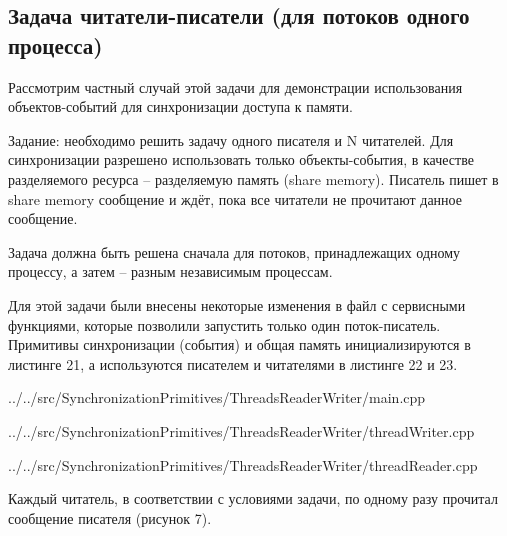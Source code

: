 \documentclass[a4paper, 12pt]{article}		%
\begin{document}
\newpage
\subsection{Задача читатели-писатели (для потоков одного процесса)}

Рассмотрим частный случай этой задачи для демонстрации использования объектов-событий для синхронизации доступа к памяти.

Задание: необходимо решить задачу одного писателя и N читателей. Для синхронизации разрешено использовать только объекты-события, в качестве разделяемого ресурса -- разделяемую память (share memory). Писатель пишет в share memory сообщение и ждёт, пока все читатели не прочитают данное сообщение.

Задача должна быть решена сначала для потоков, принадлежащих одному процессу, а затем – разным независимым процессам.

Для этой задачи были внесены некоторые изменения в файл с сервисными функциями, которые позволили запустить только один поток-писатель. Примитивы синхронизации (события) и общая память инициализируются в листинге 21, а используются писателем и читателями в листинге 22 и 23\cite{Dushutina}.


{../../src/SynchronizationPrimitives/ThreadsReaderWriter/main.cpp}


{../../src/SynchronizationPrimitives/ThreadsReaderWriter/threadWriter.cpp}


{../../src/SynchronizationPrimitives/ThreadsReaderWriter/threadReader.cpp}
\newpage

Каждый читатель, в соответствии с условиями задачи, по одному разу прочитал сообщение писателя (рисунок 7).
\end{document}
